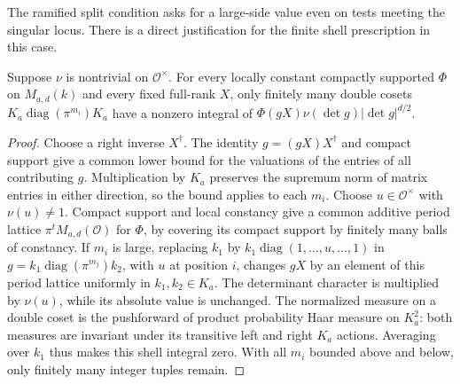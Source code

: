 The ramified split condition asks for a large-side value even on
tests meeting the singular locus. There is a direct justification for
the finite shell prescription in this case.
\begin{lemma}\label{newtheta:shell}
Suppose \(\nu\) is nontrivial on \(\mathcal O^\times\). For every
locally constant compactly supported \(\Phi\) on \(M_{a,d}(k)\) and
every fixed full-rank \(X\), only finitely many double cosets
\(K_a\operatorname{diag}(\pi^{m_i})K_a\) have a nonzero integral of
\(\Phi(gX)\nu(\det g)|\det g|^{d/2}\).
\end{lemma}
\begin{proof}
Choose a right inverse \(X^\dagger\). The identity
\(g=(gX)X^\dagger\) and compact support give a common lower bound for
the valuations of the entries of all contributing \(g\). Multiplication
by \(K_a\) preserves the supremum norm of matrix entries in either
direction, so the bound applies to each \(m_i\). Choose \(u\in
\mathcal O^\times\) with \(\nu(u)\ne1\). Compact support and local
constancy give a common additive period lattice
\(\pi^tM_{a,d}(\mathcal O)\) for \(\Phi\), by covering its compact
support by finitely many balls of constancy. If \(m_i\) is large,
replacing \(k_1\) by \(k_1\operatorname{diag}(1,\ldots,u,\ldots,1)\)
in \(g=k_1\operatorname{diag}(\pi^{m_j})k_2\), with \(u\) at
position \(i\), changes \(gX\) by an element of this period lattice
uniformly in \(k_1,k_2\in K_a\). The determinant character is
multiplied by \(\nu(u)\), while its absolute value is unchanged.
The normalized measure on a double coset is the pushforward of product
probability Haar measure on \(K_a^2\): both measures are invariant
under its transitive left and right \(K_a\) actions. Averaging over
\(k_1\) thus makes this shell integral zero. With all \(m_i\) bounded
above and below, only finitely many integer tuples remain.
\end{proof}



